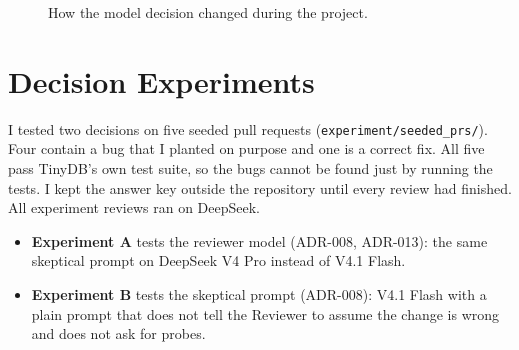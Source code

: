 \documentclass[10pt,a4paper]{article}
\newcommand{\code}[1]{\texttt{#1}}
\begin{document}
\begin{figure}[h]
\centering
{}
\caption{How the model decision changed during the project.}
\label{fig:providers}
\end{figure}

\section{Decision Experiments}

I tested two decisions on five seeded pull requests (\code{experiment/seeded\_prs/}). Four contain a
bug that I planted on purpose and one is a correct fix. All five pass TinyDB's own test suite, so the
bugs cannot be found just by running the tests. I kept the answer key outside the repository until every
review had finished. All experiment reviews ran on DeepSeek.

\begin{itemize}
\item \textbf{Experiment A} tests the reviewer model (ADR-008, ADR-013): the same skeptical prompt on
DeepSeek V4 Pro instead of V4.1 Flash.
\item \textbf{Experiment B} tests the skeptical prompt (ADR-008): V4.1 Flash with a plain prompt that does
not tell the Reviewer to assume the change is wrong and does not ask for probes.
\end{itemize}
\end{document}
